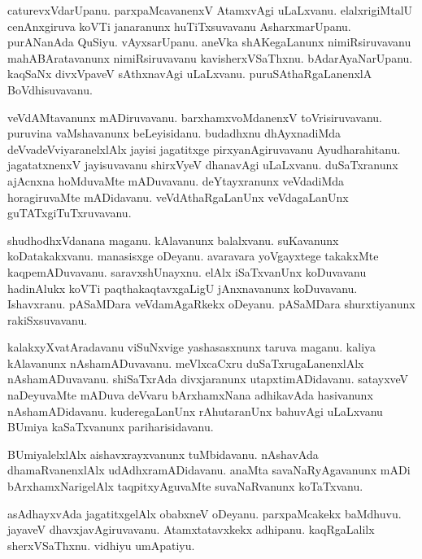 \documentclass{article}
\begin{document}
\begin{mn}%
caturevxVdarUpanu. parxpaMcavanenxV AtamxvAgi uLaLxvanu. elalxrigiMtalU cenAnxgiruva koVTi 
janaranunx huTiTxsuvavanu AsharxmarUpanu. purANanAda QuSiyu. vAyxsarUpanu. aneVka shAKegaLanunx 
nimiRsiruvavanu mahABAratavanunx nimiRsiruvavanu kavisherxVSaThxnu. bAdarAyaNarUpanu. kaqSaNx 
divxVpaveV sAthxnavAgi uLaLxvanu. puruSAthaRgaLanenxlA BoVdhisuvavanu.
\end{mn}

\begin{mn}%
veVdAMtavanunx mADiruvavanu. barxhamxvoMdanenxV toVrisiruvavanu. puruvina vaMshavanunx 
beLeyisidanu. budadhxnu dhAyxnadiMda deVvadeVviyaranelxlAlx jayisi jagatitxge pirxyanAgiruvavanu 
Ayudharahitanu. jagatatxnenxV jayisuvavanu shirxVyeV dhanavAgi uLaLxvanu. duSaTxranunx ajAcnxna 
hoMduvaMte mADuvavanu. deYtayxranunx veVdadiMda horagiruvaMte mADidavanu. veVdAthaRgaLanUnx 
veVdagaLanUnx guTATxgiTuTxruvavanu. 
\end{mn}

\begin{mn}%
shudhodhxVdanana maganu. kAlavanunx balalxvanu. suKavanunx koDatakakxvanu. manasisxge oDeyanu. 
avaravara yoVgayxtege takakxMte kaqpemADuvavanu. saravxshUnayxnu. elAlx iSaTxvanUnx koDuvavanu 
hadinAlukx koVTi paqthakaqtavxgaLigU jAnxnavanunx koDuvavanu. Ishavxranu. pASaMDara veVdamAgaRkekx 
oDeyanu. pASaMDara shurxtiyanunx rakiSxsuvavanu.
\end{mn}

\begin{mn}%
kalakxyXvatAradavanu viSuNxvige yashasasxnunx taruva maganu. kaliya kAlavanunx nAshamADuvavanu. 
meVlxcaCxru duSaTxrugaLanenxlAlx nAshamADuvavanu. shiSaTxrAda divxjaranunx utapxtimADidavanu. 
satayxveV naDeyuvaMte mADuva deVvaru bArxhamxNana adhikavAda hasivanunx nAshamADidavanu. 
kuderegaLanUnx rAhutaranUnx bahuvAgi uLaLxvanu BUmiya kaSaTxvanunx pariharisidavanu.
\end{mn}

\begin{mn}%
BUmiyalelxlAlx aishavxrayxvanunx tuMbidavanu. nAshavAda dhamaRvanenxlAlx udAdhxramADidavanu. anaMta 
savaNaRyAgavanunx mADi bArxhamxNarigelAlx taqpitxyAguvaMte suvaNaRvanunx koTaTxvanu.
\end{mn}

\begin{mn}%
asAdhayxvAda jagatitxgelAlx obabxneV oDeyanu. parxpaMcakekx baMdhuvu. jayaveV dhavxjavAgiruvavanu. 
Atamxtatavxkekx adhipanu. kaqRgaLalilx sherxVSaThxnu. vidhiyu umApatiyu.
\end{mn}
\end{document}
